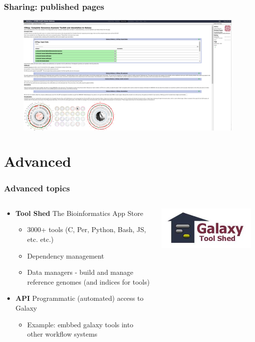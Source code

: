 \documentclass{beamer}              %
\begin{document}
\begin{frame}
	\frametitle{Sharing: published pages}
	\begin{figure}
		\includegraphics[width=\textwidth]{figures/101p_08.png}
	\end{figure}
\end{frame}

\section{Advanced}
\begin{frame}
\frametitle{Advanced topics}
  \begin{columns}[T]
    \begin{column}{.82\textwidth}
	\begin{itemize}
	\item \textbf{Tool Shed} The Bioinformatics App Store
		\begin{itemize}
		\item 3000+ tools (C, Per, Python, Bash, JS, etc. etc.)
		\item Dependency management
		\item Data managers - build and manage reference genomes (and indices for tools)
		\end{itemize}
	\item \textbf{API} 	Programmatic (automated) access to Galaxy	
		\begin{itemize}
			\item Example: embbed galaxy tools into other workflow systems
		\end{itemize}
	\end{itemize}
    \end{column}
    \begin{column}{.18\textwidth}
		\includegraphics[width=\textwidth,right]{figures/101p_09.jpg}
    \end{column}
  \end{columns}
\end{frame}
\end{document}
